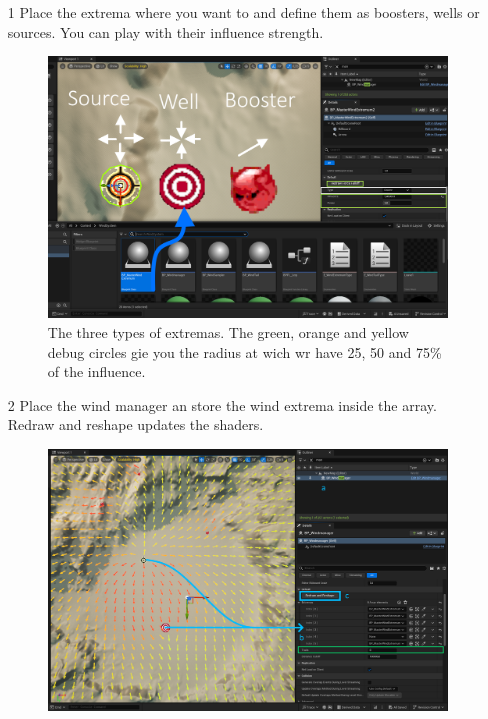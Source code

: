 \documentclass[../main.tex]{subfile}
\begin{document}
    \begin{itemize}
        \item[1] Place the extrema where you want to and define them as boosters, wells or sources. You can play with their influence strength.
        \begin{figure}[H]
            \centering
            \includegraphics[width=1\textwidth]{Ressources/WindExtrema.png}
            \caption{The three types of extremas. The green, orange and yellow debug circles gie you the radius at wich wr have 25, 50 and 75\% of the influence.}
        \end{figure}
        \item[2] Place the wind manager an store the wind extrema inside the array. Redraw and reshape updates the shaders.
        \begin{figure}[H]
            \centering
            \includegraphics[width=1\textwidth]{Ressources/WindManager.png}

\end{figure}
\end{itemize}
\end{document}
